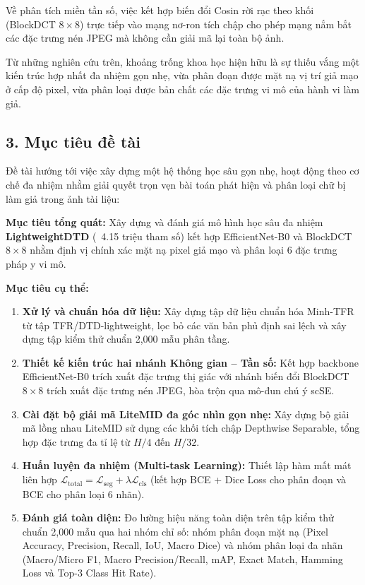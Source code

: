 Về phân tích miền tần số, việc kết hợp biến đổi Cosin rời rạc theo khối (BlockDCT $8 \times 8$) trực tiếp vào mạng nơ-ron tích chập \cite{ahmed1974discrete} cho phép mạng nắm bắt các đặc trưng nén JPEG mà không cần giải mã lại toàn bộ ảnh.

Từ những nghiên cứu trên, khoảng trống khoa học hiện hữu là sự thiếu vắng một kiến trúc hợp nhất đa nhiệm gọn nhẹ, vừa phân đoạn được mặt nạ vị trí giả mạo ở cấp độ pixel, vừa phân loại được bản chất các đặc trưng vi mô của hành vi làm giả.

\subsection{3. Mục tiêu đề tài}

\indent\indent Đề tài hướng tới việc xây dựng một hệ thống học sâu gọn nhẹ, hoạt động theo cơ chế đa nhiệm nhằm giải quyết trọn vẹn bài toán phát hiện và phân loại chữ bị làm giả trong ảnh tài liệu:\vspace{0.3cm}

\textbf{Mục tiêu tổng quát:}
Xây dựng và đánh giá mô hình học sâu đa nhiệm \textbf{LightweightDTD} (~4.15 triệu tham số) kết hợp EfficientNet-B0 và BlockDCT $8 \times 8$ nhằm định vị chính xác mặt nạ pixel giả mạo và phân loại 6 đặc trưng pháp y vi mô.

\textbf{Mục tiêu cụ thể:}
\begin{enumerate}[label=\alph*)]
    \item \textbf{Xử lý và chuẩn hóa dữ liệu:} Xây dựng tập dữ liệu chuẩn hóa Minh-TFR từ tập TFR/DTD-lightweight, lọc bỏ các văn bản phủ định sai lệch và xây dựng tập kiểm thử chuẩn 2,000 mẫu phân tầng.
    \item \textbf{Thiết kế kiến trúc hai nhánh Không gian -- Tần số:} Kết hợp backbone EfficientNet-B0 trích xuất đặc trưng thị giác với nhánh biến đổi BlockDCT $8 \times 8$ trích xuất đặc trưng nén JPEG, hòa trộn qua mô-đun chú ý scSE.
    \item \textbf{Cài đặt bộ giải mã LiteMID đa góc nhìn gọn nhẹ:} Xây dựng bộ giải mã lồng nhau LiteMID sử dụng các khối tích chập Depthwise Separable, tổng hợp đặc trưng đa tỉ lệ từ $H/4$ đến $H/32$.
    \item \textbf{Huấn luyện đa nhiệm (Multi-task Learning):} Thiết lập hàm mất mát liên hợp $\mathcal{L}_{\text{total}} = \mathcal{L}_{\text{seg}} + \lambda \mathcal{L}_{\text{cls}}$ (kết hợp BCE + Dice Loss cho phân đoạn và BCE cho phân loại 6 nhãn).
    \item \textbf{Đánh giá toàn diện:} Đo lường hiệu năng toàn diện trên tập kiểm thử chuẩn 2,000 mẫu qua hai nhóm chỉ số: nhóm phân đoạn mặt nạ (Pixel Accuracy, Precision, Recall, IoU, Macro Dice) và nhóm phân loại đa nhãn (Macro/Micro F1, Macro Precision/Recall, mAP, Exact Match, Hamming Loss và Top-3 Class Hit Rate).
\end{enumerate}

